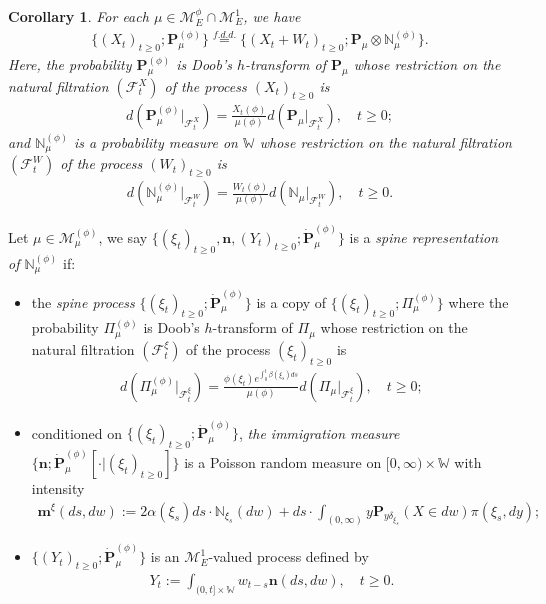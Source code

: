 \documentclass[UTF8]{pkuthss}
\theoremstyle{plain}
\newtheorem{cor}[thm]{Corollary}
\theoremstyle{definition}
\numberwithin{equation}{section}
\begin{document}
\begin{cor}
	For each $\mu \in \mathcal M_E^\phi \cap \mathcal M_E^1$, we have
\begin{align}
	\{(X_t)_{t\geq 0}; \mathbf P_\mu^{(\phi)}\}
	\overset{f.d.d.}{=} \{(X_t + W_t)_{t\geq 0}; \mathbf P_\mu \otimes \mathbb N^{(\phi)}_\mu\}.
\end{align}
	Here, the probability $\mathbf P_\mu^{(\phi)}$ is Doob's $h$-transform of $\mathbf P_\mu$ whose restriction on the natural filtration $(\mathscr F_t^X)$ of the process $(X_t)_{t\geq 0}$ is
\begin{align}
	d ( \mathbf P_\mu^{(\phi)}|_{\mathscr F_t^X})
	= \frac{X_t(\phi)}{ \mu(\phi)} d(\mathbf P_\mu|_{\mathscr F_t^X}),
	\quad t\geq 0;
\end{align}
	and $\mathbb N_\mu^{(\phi)}$ is a probability measure on $\mathbb W$ whose restriction on the natural filtration $(\mathscr F_t^W)$ of the process $(W_t)_{t\geq 0}$ is
\begin{align}
	d(\mathbb N_\mu^{(\phi)} |_{\mathscr F^W_t}  )
	= \frac{W_t(\phi)}{\mu(\phi)} d(\mathbb N_\mu |_{\mathscr F^W_t}  ),
	\quad t\geq 0.
\end{align}
\end{cor}

	Let $\mu \in \mathcal M^{(\phi)}_\mu$, we say $\{(\xi_t)_{t\geq 0}, \mathbf n, (Y_t)_{ t\geq 0}; \dot {\mathbf P}^{(\phi)}_\mu\}$ is a \emph{spine representation of $\mathbb N^{(\phi)}_\mu$} if:
\begin{itemize}
\item
	the \emph{spine process} $\{(\xi_t)_{t\geq 0}; \dot{\mathbf P}^{(\phi)}_\mu\}$ is a copy of $\{(\xi_t)_{t\geq 0}; \Pi^{(\phi)}_{\mu}\}$ where the probability $\Pi_{\mu}^{(\phi)}$ is Doob's $h$-transform of $\Pi_\mu$ whose restriction on the natural filtration $(\mathscr F_t^\xi)$ of the process $(\xi_t)_{t\geq 0}$ is
\begin{align}
	d(\Pi_{\mu}^{(\phi)} |_{\mathscr F_t^\xi})
	= \frac{\phi(\xi_t)e^{\int_0^t \beta(\xi_s)ds}}{\mu(\phi)} d(\Pi_{\mu} |_{\mathscr F_t^\xi}),
	\quad t\geq 0;
\end{align}
\item
	conditioned on $\{(\xi_t)_{t\geq 0}; \dot{\mathbf P}^{(\phi)}_\mu\}$, \emph{the immigration measure} $\{\mathbf n; \dot{\mathbf P}^{(\phi)}_\mu[\cdot |(\xi_t)_{t\geq 0}]\}$ is a Poisson random measure on $[0,\infty ) \times \mathbb W$ with
    intensity
\begin{align}
	\mathbf m^\xi(ds,dw)
	:= 2 \alpha(\xi_s) ds \cdot \mathbb N_{\xi_s}(dw) + ds \cdot \int_{(0,\infty)} y \mathbf P_{y\delta_{\xi_s}}(X\in dw) \pi(\xi_s,dy);
\end{align}
\item
	$\{(Y_t)_{t\geq 0}; \dot{\mathbf P}^{(\phi)}_\mu\}$ is an $\mathcal M^1_E$-valued process defined by
\begin{align}
	Y_t
	:= \int_{(0,t] \times \mathbb W} w_{t-s} \mathbf n(ds,dw),
	\quad t\geq 0.
\end{align}
\end{itemize}
\end{document}
